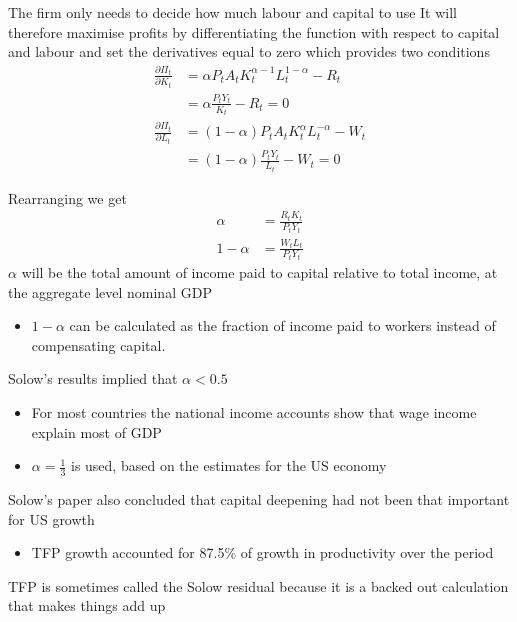 \documentclass{beamer}
\begin{document}
\begin{frame}
  The firm only needs to decide how much labour and capital to use
  It will therefore maximise profits by differentiating the function with respect to capital and labour and set the derivatives equal to zero which provides two conditions
\begin{align}
  \frac{\partial \Pi_t}{\partial K_t} &= \alpha P_tA_tK_t^{\alpha-1}L_t^{1-\alpha} -R_t\\ \nonumber
  & = \alpha \frac{P_tY_t}{K_t} - R_t = 0\\ 
  \frac{\partial \Pi_t}{\partial L_t} &= (1-\alpha) P_tA_tK_t^{\alpha}L_t^{-\alpha} - W_t \\ \nonumber
  & = (1-\alpha) \frac{P_tY_t}{L_t}- W_t = 0
\end{align}
\end{frame}

\begin{frame}
Rearranging we get
\begin{align}
  \alpha &= \frac{R_tK_t}{P_tY_t}\\ 
  1-\alpha &= \frac{W_tL_t}{P_tY_t}
\end{align}
\medskip
$\alpha$ will be the total amount of income paid to capital relative to total income, at the aggregate level nominal GDP
\begin{itemize}
  \item $1-\alpha$ can be calculated as the fraction of income paid to workers instead of compensating capital.
\end{itemize}
\end{frame}

\begin{frame}
 Solow's results implied that $\alpha<0.5$
  \begin{itemize}
    \item For most countries the national income accounts show that wage income explain most of GDP
    \item $\alpha=\frac{1}{3}$ is used, based on the estimates for the US economy
  \end{itemize}
  \medskip
  Solow's paper also concluded that capital deepening had not been that important for US growth
  \begin{itemize}
    \item TFP growth accounted for 87.5\% of growth in productivity over the period    
  \end{itemize}
  \medskip
  TFP is sometimes called the Solow residual because it is a backed out calculation that makes things add up
\end{frame}
\end{document}
